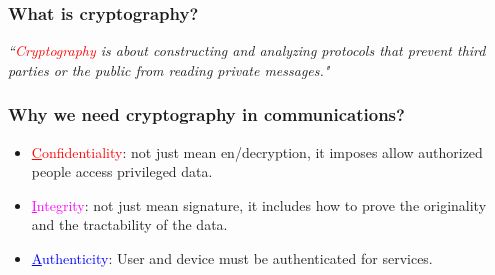 \documentclass{beamer}
\begin{document}
\frame
{
  \frametitle{What is cryptography?}

    \textit{``\textcolor{red}{Cryptography} is about constructing and analyzing protocols that prevent third parties or the public from reading private messages." \scriptsize{}}

    \begin{center}
    \end{center}

}

\frame
{
 \frametitle{Why we need cryptography in communications?}

 \begin{itemize}
 \setlength{\itemsep}{12pt}
 \item \textcolor{red}{\underline{C}onfidentiality}: not just mean en/decryption, it imposes allow authorized people access privileged data.
 \item \textcolor{magenta}{\underline{I}ntegrity}: not just mean signature, it includes how to prove the originality and the tractability of the data.
 \item \textcolor{blue}{\underline{A}uthenticity}: User and device must be authenticated for services.
 \end{itemize}
}
\end{document}
